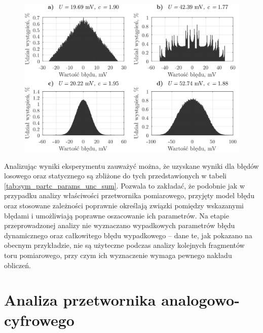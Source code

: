 \begin{figure}[htb!]
\begin{center}
\includegraphics{obrazki/hist_part_b}
\end{center}
\end{figure}

Analizując wyniki eksperymentu zauważyć można, że uzyskane wyniki dla błędów losowego oraz statycznego są zbliżone do tych przedstawionych w tabeli \ref{tab:sym_partc_params_unc_sum}. Pozwala to zakładać, że podobnie jak w przypadku analizy właściwości przetwornika pomiarowego, przyjęty model błędu oraz stosowane zależności poprawnie określają związki pomiędzy wskazanymi błędami i umożliwiają poprawne oszacowanie ich parametrów. Na etapie przeprowadzonej analizy nie wyznaczano wypadkowych parametrów błędu dynamicznego oraz całkowitego błędu wypadkowego -- dane te, jak pokazano na obecnym przykładzie, nie są użyteczne podczas analizy kolejnych fragmentów toru pomiarowego, przy czym ich wyznaczenie wymaga pewnego nakładu obliczeń.

\section{Analiza przetwornika analogowo-cyfrowego}

